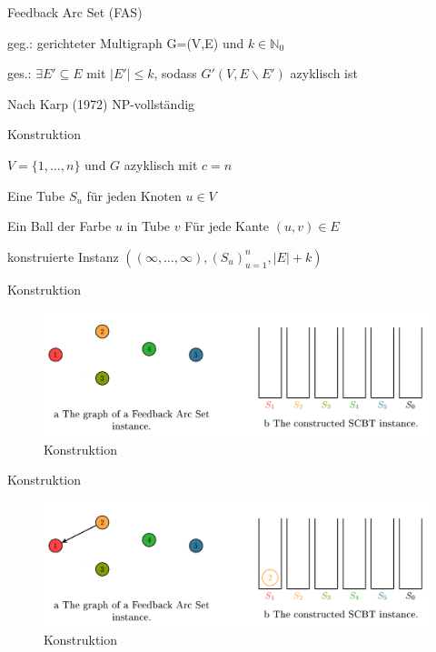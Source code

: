\documentclass{beamer}
\begin{document}
\begin{frame}{Feedback Arc Set (FAS)}
\begin{pointlist}
\item geg.: gerichteter Multigraph G=(V,E) und $k\in\mathbb{N}_0$
\item ges.: $\exists E' \subseteq E$ mit $|E'|\leq k$, sodass $G'(V,E\backslash E')$ azyklisch ist
\begin{arrowlist}
\item Nach Karp (1972) NP-vollständig
\end{arrowlist}
\end{pointlist}
\end{frame}

\begin{frame}{Konstruktion}
\begin{pointlist}
\item $V=\{1,\dots,n\}$ und $G$ azyklisch mit $c=n$
\begin{arrowlist}
\item Eine Tube $S_u$ für jeden Knoten $u\in V$
\item Ein Ball der Farbe $u$ in Tube $v$ Für jede Kante $(u,v)\in E$
\item konstruierte Instanz $((\infty, \dots, \infty), (S_u)_{u=1}^n, |E|+k)$
\end{arrowlist}
\end{pointlist}
\end{frame}

\begin{frame}{Konstruktion}
\begin{figure}[ht]
		\includegraphics[width=\textwidth]{construct10}
		\caption{Konstruktion}
    \end{figure}
\end{frame}

\begin{frame}{Konstruktion}
\begin{figure}[ht]
		\includegraphics[width=\textwidth]{construct09}
		\caption{Konstruktion}
    \end{figure}
\end{frame}
\end{document}
